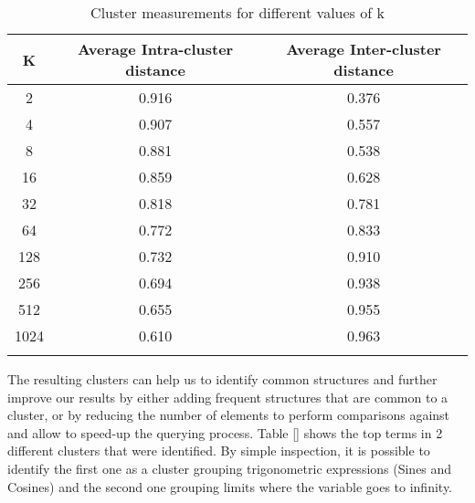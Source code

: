 \begin{longtable}{|c|c|c|}
\hline 
\textbf{K} & \textbf{Average Intra-cluster distance} & \textbf{Average Inter-cluster distance} \\ 
\hline 
2 & 0.916 & 0.376  \\ \hline 
4 & 0.907 & 0.557  \\ \hline 
8 & 0.881 & 0.538  \\ \hline 
16 & 0.859 & 0.628  \\ \hline 
32 & 0.818 & 0.781  \\ \hline 
64 & 0.772 & 0.833  \\ \hline 
128 & 0.732 & 0.910  \\ \hline 
256 & 0.694 & 0.938  \\ \hline 
512 & 0.655 & 0.955  \\ \hline 
1024 & 0.610 & 0.963  \\ \hline 
\caption{Cluster measurements for different values of k}
\label{cluster_measurements}
\end{longtable} 

The resulting clusters can help us to identify common structures and further improve our results by either adding frequent structures that are common to a cluster, or by reducing the number of elements to perform comparisons against and allow to speed-up the querying process.
Table \ref{} shows the top terms in 2 different clusters that were identified. By simple inspection, it is possible to identify the first one as a cluster grouping trigonometric expressions (Sines and Cosines) and the second one grouping limits where the variable goes to infinity.

